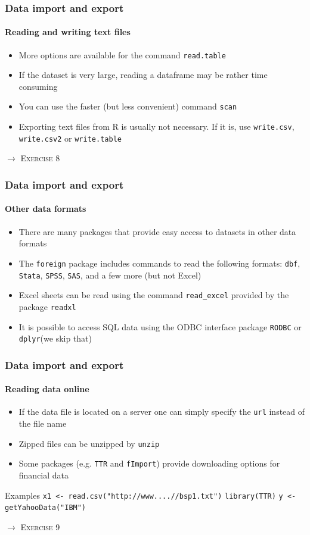 \documentclass[title={Introduction to R}, author={Mutschler and Zaharieva}, inst={Institute for Econometrics and Empirical Economics}]{beamer}
\begin{document}
\begin{frame}
\frametitle{Data import and export}
\framesubtitle{Reading and writing text files}
\begin{itemize}
\item More options are available for the command \texttt{read.table}
\item If the dataset is very large, reading a dataframe may be rather time
consuming
\item You can use the faster (but less convenient) command \texttt{scan}
\item Exporting text files from R is usually not necessary. If it is, use 
\texttt{write.csv}, \texttt{write.csv2} or \texttt{write.table}
\end{itemize}\pause
$\longrightarrow $ \textsc{Exercise 8}
\end{frame}
\begin{frame}


\frametitle{Data import and export}
\framesubtitle{Other data formats}
\begin{itemize}
\item There are many packages that provide easy access to datasets in other
data formats
\item The \texttt{foreign} package includes commands to read the following
formats: \texttt{dbf}, \texttt{Stata}, \texttt{SPSS}, \texttt{SAS}, and a
few more (but not Excel)
\item Excel sheets can be read using the command \texttt{read\_excel} provided
by the package \texttt{readxl}
\item It is possible to access SQL data using the ODBC interface package 
\texttt{RODBC} or \texttt{dplyr}(we skip that)
\end{itemize}
\end{frame}

\begin{frame}
\frametitle{Data import and export}
\framesubtitle{Reading data online}
\begin{itemize}
\item If the data file is located on a server one can simply specify the 
\texttt{url} instead of the file name
\item Zipped files can be unzipped by \texttt{unzip}
\item Some packages (e.g. \texttt{TTR} and \texttt{fImport}) provide
downloading options for financial data
\end{itemize}
\begin{block}{Examples}
\texttt{x1 <- read.csv("http://www....//bsp1.txt")}
\texttt{library(TTR)}
\texttt{y <-getYahooData("IBM")}
\end{block}\pause
$\longrightarrow $ \textsc{Exercise 9}
\end{frame}
\end{document}
